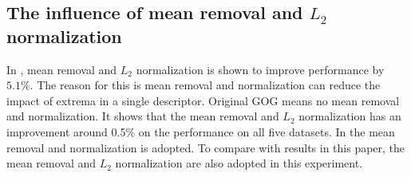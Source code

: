 \documentclass[10pt,twocolumn,letterpaper]{article}
\begin{document}
\subsection{The influence of mean removal and $L_2$ normalization}
In \cite{GOG}, mean removal and $L_2$  normalization is shown to improve performance by $5.1\%$. The reason for this is mean removal and normalization can reduce the impact of extrema in a single descriptor. 
Original GOG means no mean removal and normalization. It shows that the mean removal and $L_2$ normalization has an improvement around 0.5\% on the performance on all five datasets. In \cite{GOG} the mean removal and normalization is adopted. To compare with results in this paper, the mean removal and $L_2$ normalization are also adopted in this experiment. 
% 
%
\end{document}
